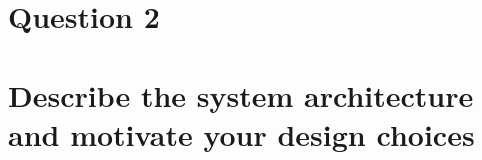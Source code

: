 \section{Question 2}

\section{Describe the system architecture and motivate your design choices}



